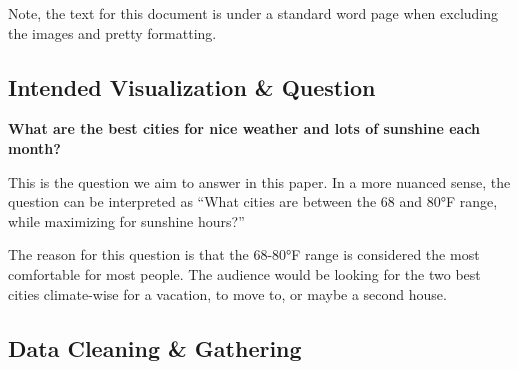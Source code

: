 \documentclass{article}
\begin{document}
\newpage
Note, the text for this document is under a standard word page when excluding the images and pretty formatting. 

\subsection{Intended Visualization \& Question}

\textbf{What are the best cities for nice weather and lots of sunshine each month?}

This is the question we aim to answer in this paper. In a more nuanced sense,
the question can be interpreted as \textquotedblleft What cities are between the 68 and 80°F
range, while maximizing for sunshine hours?\textquotedblright

The reason for this question is that the 68-80°F range is considered the most comfortable for most people. 
The audience would be looking for the two best cities climate-wise for a vacation, to move to, or maybe a second house.

\subsection{Data Cleaning \& Gathering}
\end{document}
